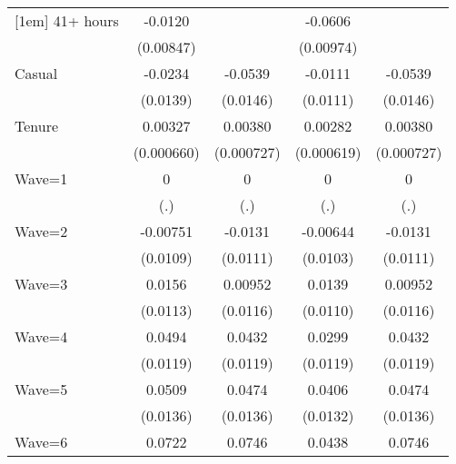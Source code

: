 {\begin{tabular}{l*{4}{c}}
[1em]
41+ hours           &     -0.0120         &                     &     -0.0606\sym{***}&                     \\
                    &   (0.00847)         &                     &   (0.00974)         &                     \\
[1em]
Casual              &     -0.0234         &     -0.0539\sym{***}&     -0.0111         &     -0.0539\sym{***}\\
                    &    (0.0139)         &    (0.0146)         &    (0.0111)         &    (0.0146)         \\
[1em]
Tenure              &     0.00327\sym{***}&     0.00380\sym{***}&     0.00282\sym{***}&     0.00380\sym{***}\\
                    &  (0.000660)         &  (0.000727)         &  (0.000619)         &  (0.000727)         \\
[1em]
Wave=1              &           0         &           0         &           0         &           0         \\
                    &         (.)         &         (.)         &         (.)         &         (.)         \\
[1em]
Wave=2              &    -0.00751         &     -0.0131         &    -0.00644         &     -0.0131         \\
                    &    (0.0109)         &    (0.0111)         &    (0.0103)         &    (0.0111)         \\
[1em]
Wave=3              &      0.0156         &     0.00952         &      0.0139         &     0.00952         \\
                    &    (0.0113)         &    (0.0116)         &    (0.0110)         &    (0.0116)         \\
[1em]
Wave=4              &      0.0494\sym{***}&      0.0432\sym{***}&      0.0299\sym{*}  &      0.0432\sym{***}\\
                    &    (0.0119)         &    (0.0119)         &    (0.0119)         &    (0.0119)         \\
[1em]
Wave=5              &      0.0509\sym{***}&      0.0474\sym{***}&      0.0406\sym{**} &      0.0474\sym{***}\\
                    &    (0.0136)         &    (0.0136)         &    (0.0132)         &    (0.0136)         \\
[1em]
Wave=6              &      0.0722\sym{***}&      0.0746\sym{***}&      0.0438\sym{**} &      0.0746\sym{***}\\

\end{tabular}}
